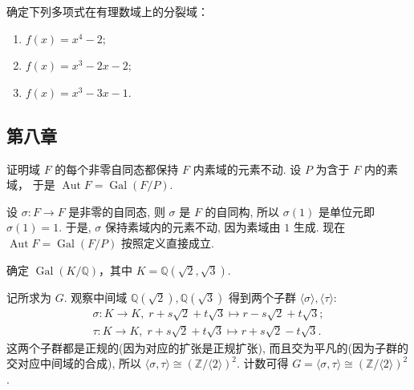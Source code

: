 \setcounter{pb}{10}
\begin{problem}
    确定下列多项式在有理数域上的分裂域：
    \begin{enumerate}[label=(\roman*)]
        \item $ f(x) = x^4 - 2 $;
        \item $ f(x) = x^3 - 2x - 2 $;
        \item $ f(x) = x^3 - 3x - 1 $.
    \end{enumerate}
\end{problem}

\begin{solution}
    
\end{solution}

\subsection{第八章}
\setcounter{pb}{2}
\begin{problem}
    证明域 $ F $ 的每个非零自同态都保持 $ F $ 内素域的元素不动. 设 $ P $ 为含于 $ F $ 内的素域， 于是 $ \operatorname{Aut} F = \operatorname{Gal}(F/P) $.
\end{problem}

\begin{solution}
    设 $\sigma\colon F\to F$ 是非零的自同态, 则 $\sigma$ 是 $F$ 的自同构, 
    所以 $\sigma(1)$ 是单位元即 $\sigma(1)=1$. 于是, $\sigma$ 保持素域内的元素不动, 因为素域由 $1$ 生成. 
    现在 $\operatorname{Aut}F=\operatorname{Gal}(F/P)$ 按照定义直接成立. 
\end{solution}

\setcounter{pb}{4}
\begin{problem}
    确定 $ \operatorname{Gal}(K/\mathbb{Q}) $，其中 $ K = \mathbb{Q}(\sqrt{2}, \sqrt{3}) $.
\end{problem}

\begin{solution}
    记所求为 $G$. 观察中间域 $\mathbb{Q}(\sqrt{2}),\mathbb{Q}(\sqrt{3})$ 得到两个子群 $\langle  \sigma \rangle, \langle \tau \rangle  $:
    \[
        \begin{split}
            \sigma\colon  K\to K,\; r+s\sqrt{2}+t\sqrt{3}\mapsto r-s\sqrt{2}+t\sqrt{3};\\
            \tau\colon  K\to K,\; r+s\sqrt{2}+t\sqrt{3}\mapsto r+s\sqrt{2}-t\sqrt{3}.
        \end{split}
    \]
    这两个子群都是正规的(因为对应的扩张是正规扩张), 而且交为平凡的(因为子群的交对应中间域的合成), 所以 $\langle \sigma,\tau \rangle \cong (\mathbb{Z}/\langle 2 \rangle)^{2} $. 
    计数可得 $G=\langle \sigma,\tau \rangle \cong (\mathbb{Z}/\langle 2 \rangle)^{2}$.
\end{solution}

